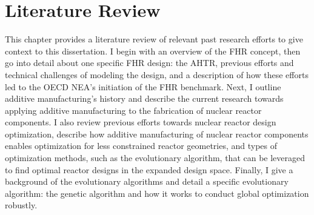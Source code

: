\chapter{Literature Review}
\label{chap:lit-review}

This chapter provides a literature review of relevant past research efforts 
to give context to this dissertation. 
I begin with an overview of the \gls{FHR} concept, 
then go into detail about one specific \gls{FHR} design: the \gls{AHTR}, 
previous efforts and technical challenges of modeling the design, and a 
description of how these efforts led to the \gls{OECD} \gls{NEA}'s initiation 
of the \gls{FHR} benchmark.
Next, I outline additive manufacturing's history and describe the current 
research towards applying additive manufacturing to the fabrication of 
nuclear reactor components. 
I also review previous efforts towards nuclear reactor design optimization, 
describe how additive manufacturing of nuclear reactor components enables 
optimization for less constrained reactor geometries, and types of optimization 
methods, such as the evolutionary algorithm, that can be leveraged to find 
optimal reactor designs in the expanded design space.   
Finally, I give a background of the evolutionary algorithms and detail a specific 
evolutionary algorithm: the genetic algorithm and how it works to conduct global 
optimization robustly.

